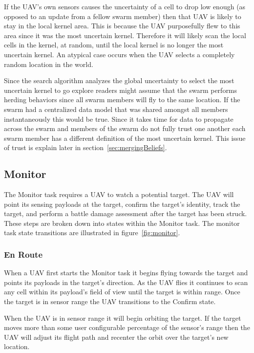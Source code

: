 If the UAV's own sensors causes the uncertainty of a cell to drop low enough (as opposed to an update from a fellow swarm member) then that UAV is likely to stay in the local kernel area.  This is because the UAV purposefully flew to this area since it was the most uncertain kernel.  Therefore it will likely scan the local cells in the kernel, at random, until the local kernel is no longer the most uncertain kernel.  An atypical case occurs when the UAV selects a completely random location in the world.

Since the search algorithm analyzes the global uncertainty to select the most uncertain kernel to go explore readers might assume that the swarm performs herding behaviors since all swarm members will fly to the same location.  If the swarm had a centralized data model that was shared amongst all members instantaneously this would be true.  Since it takes time for data to propagate across the swarm and members of the swarm do not fully trust one another each swarm member has a different definition of the most uncertain kernel.  This issue of trust is explain later in section~\ref{sec:mergingBeliefs}.

\subsection{Monitor}
The Monitor task requires a UAV to watch a potential target.  The UAV will point its sensing payloads at the target, confirm the target's identity, track the target, and perform a battle damage assessment after the target has been struck.  These steps are broken down into states within the Monitor task.  The monitor task state transitions are illustrated in figure~\ref{fig:monitor}.

\subsubsection{En Route}
When a UAV first starts the Monitor task it begins flying towards the target and points its payloads in the target's direction.  As the UAV flies it continues to scan any cell within its payload's field of view until the target is within range.  Once the target is in sensor range the UAV transitions to the Confirm state.  

When the UAV is in sensor range it will begin orbiting the target.  If the target moves more than some user configurable percentage of the sensor's range then the UAV will adjust its flight path and recenter the orbit over the target's new location.

